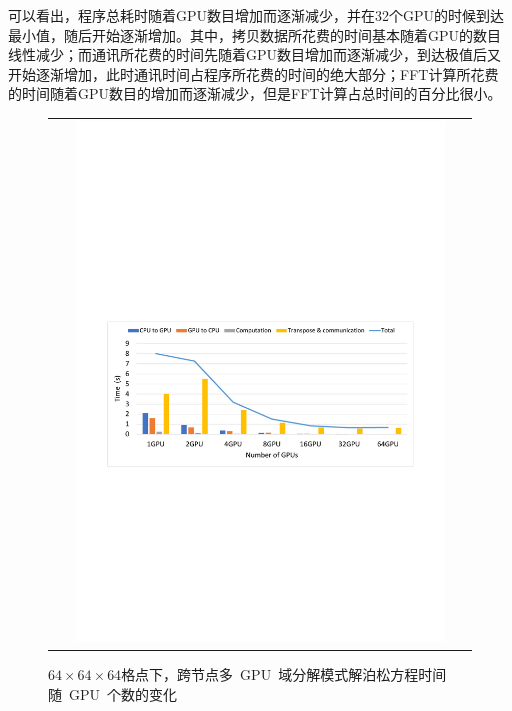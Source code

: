 可以看出，程序总耗时随着GPU数目增加而逐渐减少，并在32个GPU的时候到达最小值，随后开始逐渐增加。其中，拷贝数据所花费的时间基本随着GPU的数目线性减少；而通讯所花费的时间先随着GPU数目增加而逐渐减少，到达极值后又开始逐渐增加，此时通讯时间占程序所花费的时间的绝大部分；FFT计算所花费的时间随着GPU数目的增加而逐渐减少，但是FFT计算占总时间的百分比很小。

\begin{figure}[!htb]
  \centering
  \begin{tabular}{|l|l|}
    \multicolumn{2}{c}{
    \includegraphics[width=0.9\textwidth]{Img/domain_decomposition_Titan64.pdf}} \\
  \end{tabular}
  \caption{$64 \times 64 \times 64$格点下，跨节点多~GPU~域分解模式解泊松方程时间随~GPU~个数的变化}
  \label{fig:TITAN_GPU_Poisson64}
\end{figure}

